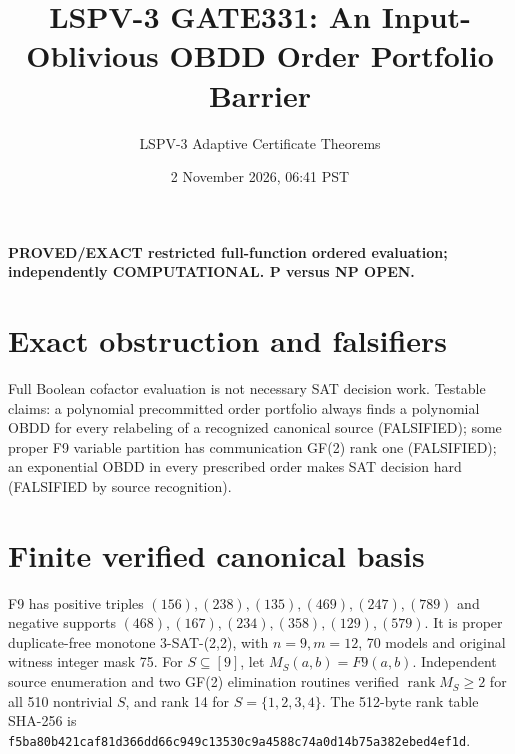 \documentclass[11pt]{article}
\title{LSPV-3 GATE331: An Input-Oblivious OBDD Order Portfolio Barrier}
\author{LSPV-3 Adaptive Certificate Theorems}
\date{2 November 2026, 06:41 PST}
\begin{document}
\maketitle
\noindent\textbf{PROVED/EXACT restricted full-function ordered evaluation; independently COMPUTATIONAL. P versus NP OPEN.}
\section{Exact obstruction and falsifiers}
Full Boolean cofactor evaluation is not necessary SAT decision work. Testable claims: a polynomial precommitted order portfolio always finds a polynomial OBDD for every relabeling of a recognized canonical source (FALSIFIED); some proper F9 variable partition has communication GF(2) rank one (FALSIFIED); an exponential OBDD in every prescribed order makes SAT decision hard (FALSIFIED by source recognition).
\section{Finite verified canonical basis}
F9 has positive triples $(156),(238),(135),(469),(247),(789)$ and negative supports $(468),(167),(234),(358),(129),(579)$. It is proper duplicate-free monotone 3-SAT-(2,2), with $n=9,m=12$, 70 models and original witness integer mask 75. For $S\subseteq[9]$, let $M_S(a,b)=F9(a,b)$. Independent source enumeration and two GF(2) elimination routines verified $\operatorname{rank}M_S\ge2$ for all 510 nontrivial $S$, and rank 14 for $S=\{1,2,3,4\}$. The 512-byte rank table SHA-256 is \texttt{f5ba80b421caf81d366dd66c949c13530c9a4588c74a0d14b75a382ebed4ef1d}.
\end{document}
